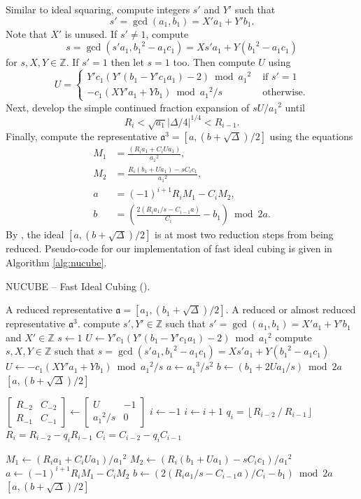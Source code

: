 \documentclass{ucalgthes1}
\theoremstyle{definition}
\newcommand{\ZZ}{\mathbb{Z}}
\newcommand{\matrixtt}[4]{\left[ \begin{array}{rr} #1 & #2 \\ #3 & #4 \end{array} \right]}
\newcommand{\floor}[1]{\left\lfloor #1 \right\rfloor}
\begin{document}
Similar to ideal squaring, compute integers $s'$ and $Y'$ such that
\[
s' = \gcd(a_1, b_1) = X'a_1 + Y'b_1.
\]
Note that $X'$ is unused. If $s' \neq 1$, compute
\[
s = \gcd(s'a_1, {b_1}^2 - a_1c_1) = Xs'a_1 + Y({b_1}^2 - a_1c_1)
\]
for $s, X, Y \in \ZZ$.  If $s' = 1$ then let $s = 1$ too.  Then compute $U$ using
\[
U = \begin{cases}
		Y'c_1(Y'(b_1 - Y'c_1a_1) - 2) \bmod {a_1}^2 & \textrm{ if } s' = 1 \\
		-c_1(XY'a_1+Yb_1) \bmod {a_1}^2/s & \textrm{ otherwise.}
    \end{cases}
\]
Next, develop the simple continued fraction expansion of $sU/{a_1}^2$ until
\[
	R_i < \sqrt{a_1}|\Delta/4|^{1/4} < R_{i-1}.
\]
Finally, compute the representative $\mathfrak a^3 = [a, (b + \sqrt\Delta)/2]$ using the equations
\begin{align*}
	M_1 &= \frac{(R_ia_1 + C_iUa_1)}{{a_1}^2}, \\
	M_2 &= \frac{R_i(b_1 + Ua_1) - sC_ic_1}{{a_1}^2}, \\
	a &= (-1)^{i+1} R_i M_1 - C_i M_2, \\
	b &= \left( \frac{2(R_ia_1/s - C_{i-1}a)}{C_i} - b_1 \right) \bmod 2a.
\end{align*}
By \cite[p.15~Theorem~5.1]{Imbert2010}, the ideal $[a, (b + \sqrt\Delta)/2]$ is at most two reduction steps from being reduced.  Pseudo-code for our implementation of fast ideal cubing is given in Algorithm \ref{alg:nucube}.


\begin{algorithm}[htb]
\caption{NUCUBE -- Fast Ideal Cubing (\cite[p.26]{Imbert2010}).}
\label{alg:nucube}
\begin{algorithmic}[1]
\Require A reduced representative $\mathfrak a = [a_1, (b_1+\sqrt\Delta)/2]$.
\Ensure A reduced or almost reduced representative $\mathfrak a^3$.
\State compute $s',Y' \in \ZZ$ such that $s' = \gcd(a_1, b_1) = X'a_1 + Y'b_1$ and $X' \in \ZZ$
	\State $s \gets 1$
	\State $U \gets Y'c_1(Y'(b_1 - Y'c_1a_1) - 2) \bmod {a_1}^2$
\Else
	\State compute $s, X, Y \in \ZZ$ such that $s = \gcd(s'a_1, {b_1}^2 - a_1c_1) = Xs'a_1 + Y({b_1}^2 - a_1c_1)$
	\State $U \gets -c_1(XY'a_1+Yb_1) \bmod {a_1}^2/s$
\EndIf
{}
	\State $a \gets {a_1}^3/s^2$
	\State $b \gets (b_1 + 2Ua_1/s) \bmod 2a$
	\State \Return $[a, (b+\sqrt\Delta)/2]$
\EndIf

\State $\matrixtt{R_{-2}}{C_{-2}}{R_{-1}}{C_{-1}} \gets \matrixtt{U}{-1}{{a_1}^2/s}{0}$
\State $i \gets -1$
	\State $i \gets i + 1$
	\State $q_i = \floor{R_{i-2} ~/~ R_{i-1}}$
	\State $R_i = R_{i-2}-q_i R_{i-1}$
	\State $C_i=C_{i-2}-q_i C_{i-1}$
\EndWhile

\State $M_1 \gets (R_ia_1 + C_iUa_1) / {a_1}^2$
\State $M_2 \gets (R_i(b_1 + Ua_1) - sC_ic_1) / {a_1}^2$
\State $a \gets (-1)^{i+1} R_i M_1 - C_i M_2$
\State $b \gets (2(R_ia_1/s - C_{i-1}a)/C_i - b_1) \bmod 2a$
\State \Return $[a, (b+\sqrt\Delta)/2]$
\end{algorithmic}
\end{algorithm}
\end{document}
